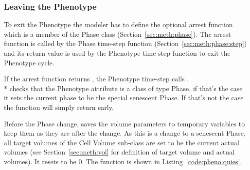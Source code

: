 
\subsubsection{Leaving the Phenotype}\label{sec:meth:pheno:go-quies}

To exit the Phenotype the modeler has to define the optional arrest function which is a member of the Phase class (Section~\ref{sec:meth:phase}). The arrest function is called by the Phase time-step function (Section~\ref{sec:meth:phase:step}) and its return value is used by the Phenotype time-step function to exit the Phenotype cycle.

If the arrest function returns , the Phenotype time-step calls . \\* checks that the Phenotype attribute  is a class of type Phase, if that's the case it sets the current phase to be the special senescent Phase. If that's not the case the function will simply return early.

Before the Phase change,  saves the volume parameters to temporary variables to keep them as they are after the change. As this is a change to a senescent Phase, all target volumes of the Cell Volume sub-class are set to be the current actual volumes (see Section~\ref{sec:meth:vol} for definition of target volume and actual volumes). It resets  to be 0. The  function is shown in Listing~\ref{code:pheno:quies}.

